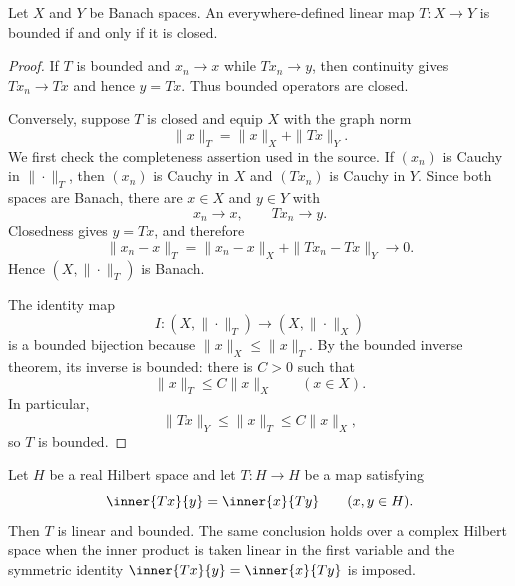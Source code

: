 \begin{notetheorem}
Let $X$ and $Y$ be Banach spaces.  An everywhere-defined linear map
$T\colon X\to Y$ is bounded if and only if it is closed.
\end{notetheorem}

\begin{proof}
If $T$ is bounded and $x_n\to x$ while $Tx_n\to y$, then continuity gives
$Tx_n\to Tx$ and hence $y=Tx$.  Thus bounded operators are closed.

Conversely, suppose $T$ is closed and equip $X$ with the graph norm
\[
  \|x\|_T=\|x\|_X+\|Tx\|_Y.
\]
We first check the completeness assertion used in the source.  If $(x_n)$ is
Cauchy in $\|\cdot\|_T$, then $(x_n)$ is Cauchy in $X$ and $(Tx_n)$ is
Cauchy in $Y$.  Since both spaces are Banach, there are $x\in X$ and $y\in Y$
with
\[
  x_n\to x,
  \qquad
  Tx_n\to y.
\]
Closedness gives $y=Tx$, and therefore
\[
  \|x_n-x\|_T
  =\|x_n-x\|_X+\|Tx_n-Tx\|_Y\longrightarrow0.
\]
Hence $(X,\|\cdot\|_T)$ is Banach.

The identity map
\[
  I\colon(X,\|\cdot\|_T)\longrightarrow(X,\|\cdot\|_X)
\]
is a bounded bijection because $\|x\|_X\le\|x\|_T$.  By the bounded inverse
theorem, its inverse is bounded: there is $C>0$ such that
\[
  \|x\|_T\le C\|x\|_X
  \qquad(x\in X).
\]
In particular,
\[
  \|Tx\|_Y\le\|x\|_T\le C\|x\|_X,
\]
so $T$ is bounded.
\end{proof}

\begin{notetheorem}
Let $H$ be a real Hilbert space and let $T\colon H\to H$ be a map satisfying
\[
  \inner{Tx}{y}=\inner{x}{Ty}
  \qquad(x,y\in H).
\]
Then $T$ is linear and bounded.  The same conclusion holds over a complex Hilbert space when the inner
product is taken linear in the first variable and the symmetric identity
$\inner{Tx}{y}=\inner{x}{Ty}$ is imposed.
\end{notetheorem}

